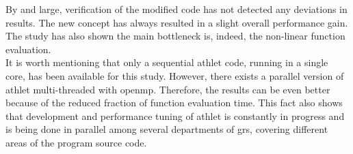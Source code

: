 By and large, verification of the modified code has not detected any deviations in results. The new concept has always resulted in a slight overall performance gain. The study has also shown the main bottleneck is, indeed, the non-linear function evaluation.\\


It is worth mentioning that only a sequential \gls{athlet} code, running in a single core, has been available for this study. However, there exists a parallel version of \gls{athlet} multi-threaded with \gls{openmp}. Therefore, the results can be even better because of the reduced fraction of function evaluation time. This fact also shows that development and performance tuning of \gls{athlet} is constantly in progress and is being done in parallel among several departments of \gls{grs}, covering different areas of the program source code.\\


